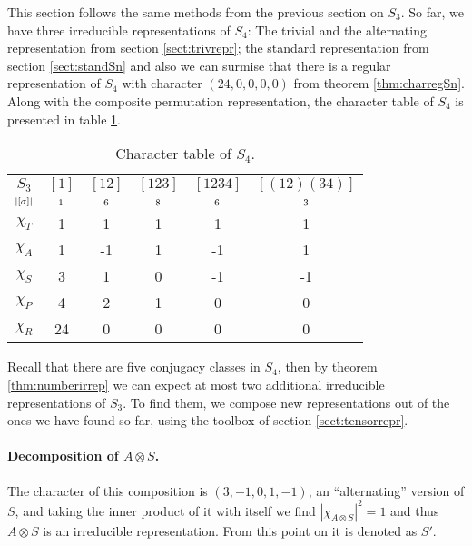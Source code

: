 \begin{example}
	This section follows the same methods from the previous section on $S_3$. So far, we have three irreducible representations of $S_4$: The trivial and the alternating representation from section \ref{sect:trivrepr}; the standard representation from section \ref{sect:standSn} and also we can surmise that there is a regular representation of $S_4$ with character $(24,0,0,0,0)$ from theorem \ref{thm:charregSn}. Along with the composite permutation representation, the character table of $S_4$ is presented in table \ref{table:charS4}. 
	
	\begin{table}[hbt!]
		\centering
		\begin{tabular}{c | c c c c c}
			$S_3$      & $[1]$   & $[12]$  & $[123]$ & $[1234]$ & $[(12)(34)]$ \\
			$\scriptstyle|[\sigma]|$ & $\scriptstyle 1$ & $\scriptstyle 6$ & $\scriptstyle 8$ & $\scriptstyle 6$  & $\scriptstyle 3$      \\ \hline
			$\chi_T$     & 1       & 1       & 1       & 1        & 1            \\
			$\chi_A$     & 1       & -1      & 1       & -1       & 1            \\
			$\chi_S$     & 3       & 1       & 0       & -1       & -1           \\ \hline\hline
			$\chi_P$     & 4       & 2       & 1       & 0        & 0            \\
			$\chi_R$     & 24      & 0       & 0       & 0        & 0            	\end{tabular}
		\caption{Character table of $S_4$.}
		\label{table:charS4}
	\end{table}
	
	Recall that there are five conjugacy classes in $S_4$, then by theorem \ref{thm:numberirrep} we can expect at most two additional irreducible representations of $S_3$. To find them, we compose new representations out of the ones we have found so far, using the toolbox of section \ref{sect:tensorrepr}.
	
	\paragraph{Decomposition of $A \otimes S$.} The character of this composition is $(3,-1,0,1,-1)$, an ``alternating'' version of $S$, and taking the inner product of it with itself we find $|\chi_{A \otimes S}|^2 = 1$ and thus $A \otimes S$ is an irreducible representation. From this point on it is denoted as $S'$.
	

\end{example}
